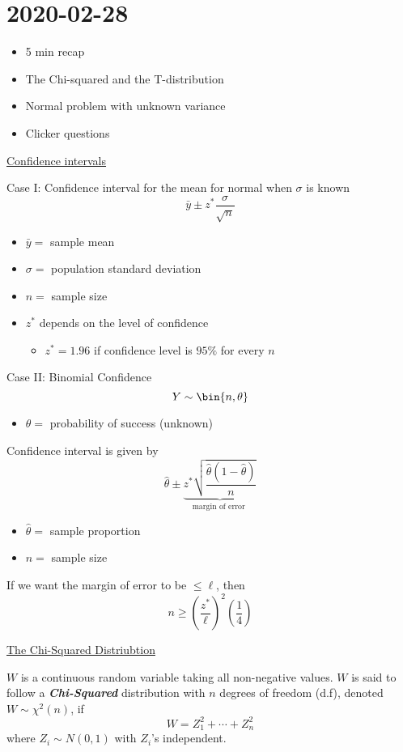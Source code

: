 \section{2020-02-28}
\begin{itemize}
    \item 5 min recap
    \item The Chi-squared and the T-distribution
    \item Normal problem with unknown variance
    \item Clicker questions
\end{itemize}
\underline{Confidence intervals}

Case I\@: Confidence interval for the mean for normal when $ \sigma $ is known
\[ \bar{y}\pm z^* \frac{\sigma}{\sqrt{n}}  \]
\begin{itemize}
    \item $ \bar{y}= $ sample mean
    \item $ \sigma= $ population standard deviation
    \item $ n= $ sample size
    \item $ z^* $ depends on the level of confidence
          \begin{itemize}
              \item $ z^*=1.96 $ if confidence level is $ 95\% $ for every $ n $
          \end{itemize}
\end{itemize}

Case II\@: Binomial Confidence
\[ Y \sim \bin{n,\theta} \]
\begin{itemize}
    \item $ \theta= $ probability of success (unknown)
\end{itemize}
Confidence interval is given by
\[ \hat{\theta}\pm \underbrace{z^* \sqrt{\frac{\hat{\theta}\left( 1-\hat{\theta} \right)}{n}}}_{\text{
            margin of error
        }} \]
\begin{itemize}
    \item $ \hat{\theta}= $ sample proportion
    \item $ n= $ sample size
\end{itemize}
If we want the margin of error to be $ \leqslant \ell $, then
\[ n\geqslant \left( \frac{z^*}{\ell} \right)^2\left( \frac{1}{4} \right) \]

\underline{The Chi-Squared Distriubtion}

\begin{Definition}{}{}
    $ W $ is a continuous random variable taking all non-negative values.
    $ W $ is said to follow a \textbf{\emph{Chi-Squared}} distribution
    with $ n $ degrees of freedom (d.f), denoted $ W \sim \chi^2(n) $,
    if
    \[ W=Z_1^2+\cdots+Z_n^2 \]
    where $ Z_i \sim N(0,1) $ with $ Z_i $'s independent.
\end{Definition}

